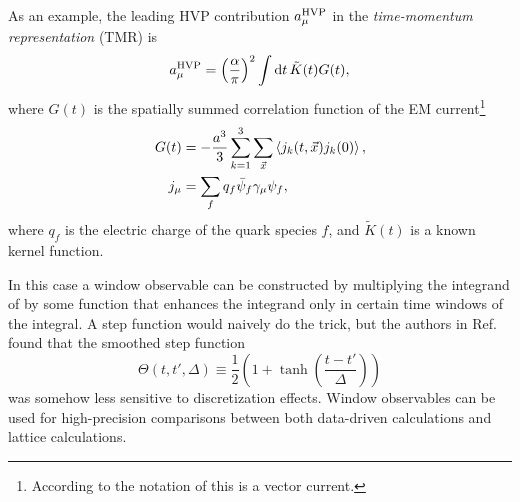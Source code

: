 As an example, the leading HVP contribution $a_\mu^{\rm HVP}$ in the
{\it time-momentum representation} (TMR) is~\cite{bernecker_vector_2011}
\begin{equation}\label{eq:amuhvp}
  a_\mu^{\rm HVP}=\left(\frac{\alpha}{\pi}\right)^2\int\dd{t}\tilde{K}(t)G(t),
\end{equation}
where $G(t)$ is the spatially summed correlation function of the EM 
current\footnote{According to the notation of 
this is a vector current.}
\begin{equation}\begin{aligned}
  G(t) &=-\frac{a^3}{3}\sum_{k=1}^3\sum_{\vec{x}}\ev{j_k(t,\vec{x})j_k(0)},\\
  j_\mu&=\sum_fq_f\bar{\psi}_f\gamma_\mu\psi_f,
\end{aligned}\end{equation}
where $q_f$ is the electric charge of the quark species $f$,
and $\tilde{K}(t)$ is a known kernel function.

In this case a window observable
can be constructed by multiplying the integrand of  by some
function that enhances the integrand only in certain time windows of the
integral. A step function would naively do the trick, but the authors
in Ref.~\cite{blum_calculation_2018} found that the smoothed step function
\begin{equation}
  \Theta(t,t',\Delta)\equiv\frac{1}{2}\left(1+\tanh\left(\frac{t-t'}{\Delta}\right)\right)
\end{equation}
was somehow less sensitive to discretization effects.
Window observables can be used for high-precision comparisons between both
data-driven calculations and lattice calculations.



